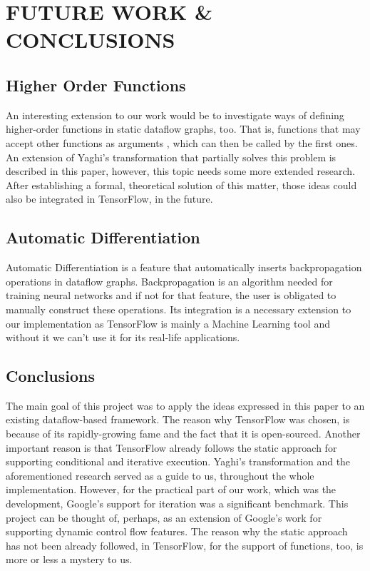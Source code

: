 \documentclass[ack,preface]{dithesis}
\begin{document}
\chapter{FUTURE WORK \& CONCLUSIONS}


   \section{Higher Order Functions}

An interesting extension to our work would be to investigate ways of defining higher-order functions in static dataflow graphs, too. That is, functions that may accept other functions as arguments , which can then be called by the first ones. An extension of Yaghi's transformation that partially solves this problem is described in this  \cite{RondogiannisW99} paper, however, this topic needs some more extended research. After establishing a formal, theoretical solution of this matter, those ideas could also be integrated in TensorFlow, in the future.

    \section{Automatic Differentiation}

Automatic Differentiation is a feature that automatically inserts backpropagation operations in dataflow graphs. Backpropagation is an algorithm needed for training neural networks and if not for that feature, the user is obligated to manually construct these operations. Its integration is a necessary extension to our implementation as TensorFlow is mainly a  Machine Learning tool and without it we can't use it for its real-life applications.

    \section{Conclusions}
The main goal of this project was to apply the ideas expressed in this \cite{Rondogiannis:1997} paper to an existing dataflow-based framework. The reason why TensorFlow was chosen, is because of its rapidly-growing fame and the fact that it is open-sourced. Another important reason is that TensorFlow already follows the static approach for supporting conditional and iterative execution. Yaghi's transformation and the aforementioned research  served as a guide to us, throughout the whole implementation.  However, for the practical part of our work, which was the development,  Google's support for iteration was a significant benchmark. This project can be thought of, perhaps, as an extension of Google's work for supporting dynamic control flow features. The reason why the static approach has not been already followed, in TensorFlow, for the support of functions, too,  is more or less a mystery to us.
\end{document}
